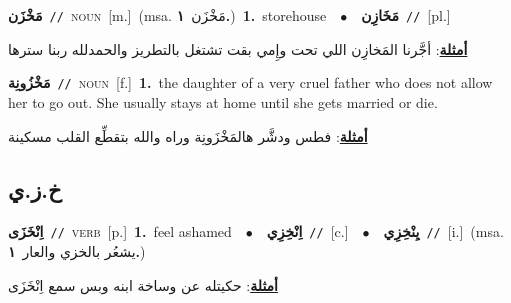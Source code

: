\documentclass[10pt,a4paper,twoside]{article} %
\begin{document}
\begin{multicols}{2}
{\setlength\topsep{0pt}\textbf{\foreignlanguage{arabic}{مَخْزَن}}\ {\color{gray}\texttt{//}\color{black}}\ \textsc{noun}\ [m.]\ \color{gray}(msa. \foreignlanguage{arabic}{مَخْزَن}~\foreignlanguage{arabic}{\textbf{١.}})\color{black}\ \textbf{1.}~storehouse\ \ $\bullet$\ \ \setlength\topsep{0pt}\textbf{\foreignlanguage{arabic}{مَخَازِن}}\ {\color{gray}\texttt{//}\color{black}}\ [pl.]\  \begin{flushright}\color{gray}\foreignlanguage{arabic}{\textbf{\underline{\foreignlanguage{arabic}{أمثلة}}}: أجَّرنا المَخازِن اللي تحت وإِمي بقت تشتغل بالتطريز والحمدلله ربنا سترها}\end{flushright}\color{black}} \vspace{2mm}

{\setlength\topsep{0pt}\textbf{\foreignlanguage{arabic}{مَخْزُونِة}}\ {\color{gray}\texttt{//}\color{black}}\ \textsc{noun}\ [f.]\ \textbf{1.}~the daughter of a very cruel father who does not allow her to go out. She usually stays at home until she gets married or die.\  \begin{flushright}\color{gray}\foreignlanguage{arabic}{\textbf{\underline{\foreignlanguage{arabic}{أمثلة}}}: فطس ودشَّر هالمَخْزَونِة وراه والله بتقطِّع القلب مسكينة}\end{flushright}\color{black}} \vspace{2mm}

\vspace{-3mm}
\subsection*{\color{blue}\foreignlanguage{arabic}{خ.ز.ي}\color{blue}{}} 

{\setlength\topsep{0pt}\textbf{\foreignlanguage{arabic}{اِنْخَزَى}}\ {\color{gray}\texttt{//}\color{black}}\ \textsc{verb}\ [p.]\ \textbf{1.}~feel ashamed\ \ $\bullet$\ \ \setlength\topsep{0pt}\textbf{\foreignlanguage{arabic}{اِنْخِزِي}}\ {\color{gray}\texttt{//}\color{black}}\ [c.]\ \ $\bullet$\ \ \setlength\topsep{0pt}\textbf{\foreignlanguage{arabic}{يِنْخِزِي}}\ {\color{gray}\texttt{//}\color{black}}\ [i.]\ \color{gray}(msa. \foreignlanguage{arabic}{يشعُر بالخزي والعار}~\foreignlanguage{arabic}{\textbf{١.}})\color{black}\  \begin{flushright}\color{gray}\foreignlanguage{arabic}{\textbf{\underline{\foreignlanguage{arabic}{أمثلة}}}: حكيتله عن وساخة ابنه وبس سمع اِنْخَزَى}\end{flushright}\color{black}} \vspace{2mm}


\end{multicols}
\end{document}
